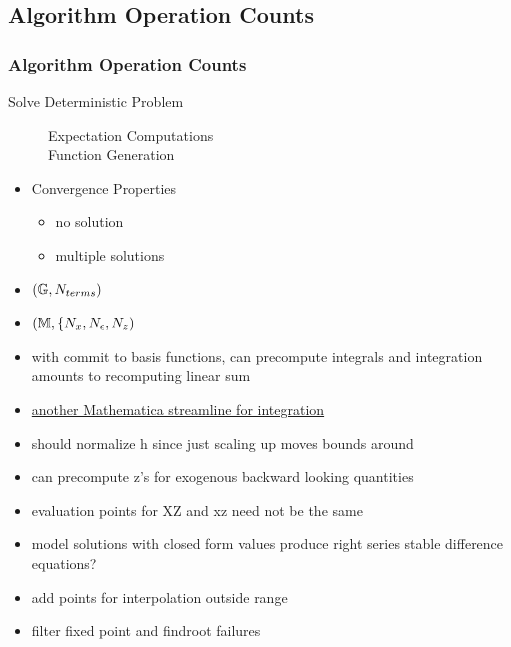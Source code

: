 \documentclass[tikz]{beamer}
\begin{document}
\subsection{Algorithm Operation Counts}
\begin{frame}
  \frametitle{Algorithm Operation Counts}
  \begin{description}
  \item[Solve Deterministic Problem]
    \begin{description}
    \item[Expectation Computations] 
    \item[Function Generation] 
    \end{description}
  \end{description}
\end{frame}
\begin{frame}
  \begin{itemize}
  \item Convergence Properties
    \begin{itemize}
    \item no solution
    \item multiple solutions
    \end{itemize}
  \end{itemize}
\end{frame}

\begin{frame}
  \begin{itemize}
   \item $({\mathbb{G}},{N_{terms}})$
  \item $(\mathbb{M},\{{N_x},{N_\epsilon},{N_z})$
  \item with commit to basis functions, can precompute integrals and 
integration amounts to recomputing linear sum
\item  \href{http://www.mathematica-journal.com/2008/11/dynamic-integration-of-interpolating-functions-and-some-concrete-optimal-stopping-problems/}{another Mathematica streamline for integration}
  \item should normalize h since just scaling up moves bounds around
  \item can precompute z's for exogenous backward looking quantities
  \item evaluation points for XZ and xz need not be the same
  \item model solutions with closed form values produce right series stable difference equations?
  \item add points for interpolation outside range
  \item filter fixed point and findroot failures
  \end{itemize}
\end{frame}
\end{document}
